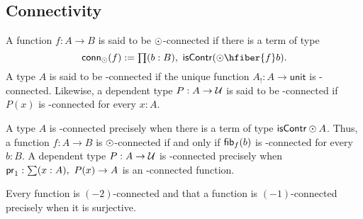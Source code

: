 \subsection{Connectivity}
\begin{defn}
A function $f:A\to B$ is said to be $\odot$-connected if there is a term of type
\begin{equation*}
\mathsf{conn}_\modal(f):=\prd{b:B}\mathsf{isContr}(\modal\hfiber{f}b). 
\end{equation*}
A type $A$ is said to be \modal-connected if the unique function
$A_!:A\to\mathsf{unit}$ is \modal-connected. Likewise, a dependent type
$P:A\to\mathcal{U}$ is said to be \modal-connected if $P(x)$ is \modal-connected for
every $x:A$. 
\end{defn}

A type $A$ is \modal-connected precisely when there is a term of type $\mathsf{isContr}\odot A$. Thus, a function $f:A\to B$ is
$\odot$-connected if and only if $\mathsf{fib}_{f}(b)$ is \modal-connected for every $b:B$. 
A dependent type $P:A\to\mathcal{U}$ is \modal-connected
precisely when $\proj1:\sum(x:A),\ P(x)\to A$ is an \modal-connected function.

Every function is $(-2)$-connected and that a function is $(-1)$-connected precisely when it is surjective.


